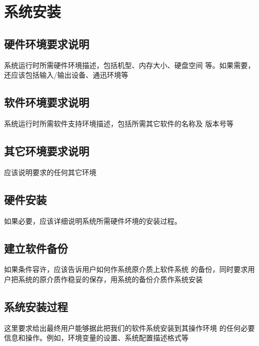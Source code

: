 \chapter{系统安装}
\section{硬件环境要求说明}
系统运行时所需硬件环境描述，包括机型、内存大小、硬盘空间
等。如果需要，还应该包括输入/输出设备、通迅环境等
\section{软件环境要求说明}
系统运行时所需软件支持环境描述，包括所需其它软件的名称及
版本号等
\section{其它环境要求说明}
应该说明要求的任何其它环境
\section{硬件安装}
如果必要，应该详细说明系统所需硬件坏境的安装过程。
\section{建立软件备份}
如果条件容许，应该告诉用户如何作系统原介质上软件系统
的备份，同时要求用户把系统的原介质作稳妥的保存，用系统的备份介质作系统安装
\section{系统安装过程}
这里要求给出最终用户能够据此把我们的软件系统安装到其操作环境
的任何必要信息和操作。例如，环境变量的设置、系统配置描述格式等